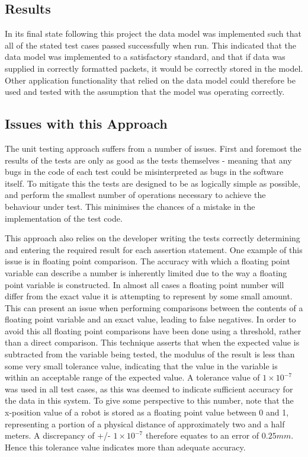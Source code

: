 \subsection{Results}
In its final state following this project the data model was implemented such that all of the stated test cases passed successfully when run. This indicated that the data model was implemented to a satisfactory standard, and that if data was supplied in correctly formatted packets, it would be correctly stored in the model. Other application functionality that relied on the data model could therefore be used and tested with the assumption that the model was operating correctly.

\subsection{Issues with this Approach}
The unit testing approach suffers from a number of issues. First and foremost the results of the tests are only as good as the tests themselves - meaning that any bugs in the code of each test could be misinterpreted as bugs in the software itself. To mitigate this the tests are designed to be as logically simple as possible, and perform the smallest number of operations necessary to achieve the behaviour under test. This minimises the chances of a mistake in the implementation of the test code. 

This approach also relies on the developer writing the tests correctly determining and entering the required result for each assertion statement. One example of this issue is in floating point comparison. The accuracy with which a floating point variable can describe a number is inherently limited due to the way a floating point variable is constructed. In almost all cases a floating point number will differ from the exact value it is attempting to represent by some small amount. This can present an issue when performing comparisons between the contents of a floating point variable and an exact value, leading to false negatives. In order to avoid this all floating point comparisons have been done using a threshold, rather than a direct comparison. This technique asserts that when the expected value is subtracted from the variable being tested, the modulus of the result is less than some very small tolerance value, indicating that the value in the variable is within an acceptable range of the expected value. A tolerance value of $ 1 \times 10^{-7} $ was used in all test cases, as this was deemed to indicate sufficient accuracy for the data in this system. To give some perspective to this number, note that the x-position value of a robot is stored as a floating point value between 0 and 1, representing a portion of a physical distance of approximately two and a half meters. A discrepancy of +/- $  1 \times 10^{-7} $ therefore equates to an error of $ 0.25 mm $. Hence this tolerance value indicates more than adequate accuracy.

